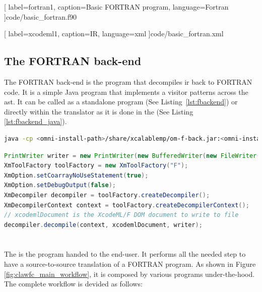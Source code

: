 
  [
    label=fortran1,
    caption=Basic FORTRAN program,
    language=Fortran
  ]{code/basic_fortran.f90}


  [
    label=xcodeml1,
    caption=\xcodemlf IR,
    language=xml
  ]{code/basic_fortran.xml}

\subsection{The FORTRAN back-end}
The FORTRAN back-end is the program that decompiles \gls{ir} back to FORTRAN
code. It is a simple Java program that implements a visitor patterns across
the \gls{ast}. It can be called as a standalone program 
(See Listing~\ref{lst:fbackend}) or directly within the translator as it is 
done in the \clawfcomp (See Listing \ref{lst:fbackend_java}).

\begin{lstlisting}[label=lst:fbackend, language=Bash, caption=Execute the 
  FORTRAN back-end as a standalone]
java -cp <omni-install-path>/share/xcalablemp/om-f-back.jar:<omni-install-path>/share/xcalablemp/om-exc-tools.jar xcodeml.f.util.omx2f -l xcodeml.xml
\end{lstlisting}

\begin{lstlisting}[label=lst:fbackend_java, language=Java, caption=FORTRAN back-end called from Java]
PrintWriter writer = new PrintWriter(new BufferedWriter(new FileWriter(outputFile)));
XmToolFactory toolFactory = new XmToolFactory("F");
XmOption.setCoarrayNoUseStatement(true);
XmOption.setDebugOutput(false);
XmDecompiler decompiler = toolFactory.createDecompiler();
XmDecompilerContext context = toolFactory.createDecompilerContext();
// xcodemlDocument is the XcodeML/F DOM document to write to file
decompiler.decompile(context, xcodemlDocument, writer); 
\end{lstlisting}

\section{\clawfcomp}
The \clawfc is the program handed to the end-user. It performs all the needed
step to have a source-to-source translation of a FORTRAN program. As shown in
Figure \ref{fig:clawfc_main_workflow}, it is composed by various programs
under-the-hood. The complete workflow is devided as follows:

